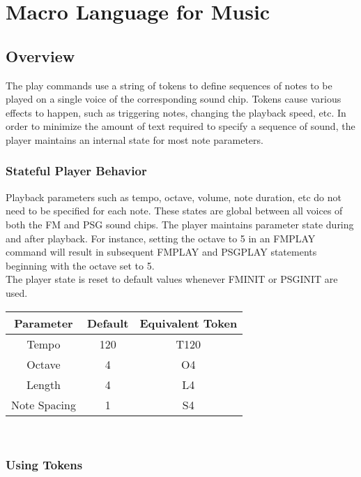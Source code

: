 \chapter{Macro Language for Music}

\section{Overview}

The play commands use a string of tokens to define sequences of notes to be
played on a single voice of the corresponding sound chip. Tokens cause various
effects to happen, such as triggering notes, changing the playback speed, etc.
In order to minimize the amount of text required to specify a sequence of
sound, the player maintains an internal state for most note parameters.

\subsection{Stateful Player Behavior}

Playback parameters such as tempo, octave, volume, note duration, etc do not
need to be specified for each note. These states are global between all voices
of both the FM and PSG sound chips. The player maintains parameter state during
and after playback. For instance, setting the octave to 5 in an {\ttfamily
FMPLAY} command will result in subsequent {\ttfamily FMPLAY} and {\ttfamily
PSGPLAY} statements beginning with the octave set to 5.\\

The player state is reset to default values whenever {\ttfamily FMINIT} or
{\ttfamily PSGINIT} are used.\\

\begin{tabular}{|c|c|c|}
	\hline
	Parameter & Default & Equivalent Token \\ \hline
	Tempo & 120 & T120 \\ \hline
	Octave & 4 & O4 \\ \hline
	Length & 4 & L4 \\ \hline
	Note Spacing & 1 & S4 \\ \hline
\end{tabular}\\

\subsection{Using Tokens}


